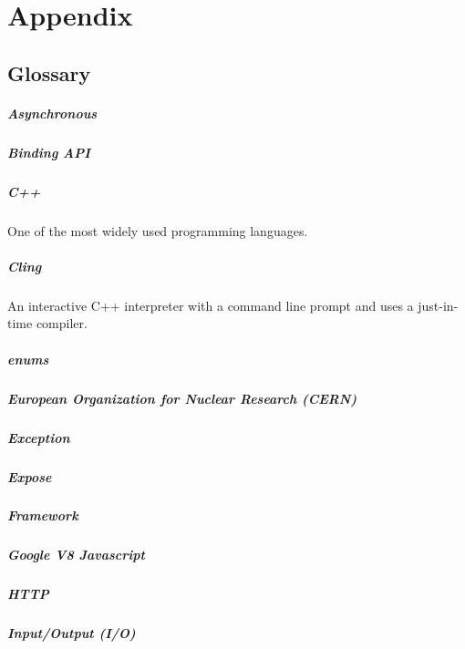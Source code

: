 \chapter{Appendix}
\section{Glossary}
\paragraph{Asynchronous}
\paragraph{Binding API}
\paragraph{C++}
One of the most widely used programming languages.
\paragraph{Cling}
An interactive C++ interpreter with a command line prompt and uses a just-in-time compiler.
\paragraph{enums}
\paragraph{European Organization for Nuclear Research (CERN)}
\paragraph{Exception}
\paragraph{Expose}
\paragraph{Framework}
\paragraph{Google V8 Javascript}
\paragraph{HTTP}
\paragraph{Input/Output (I/O)}
